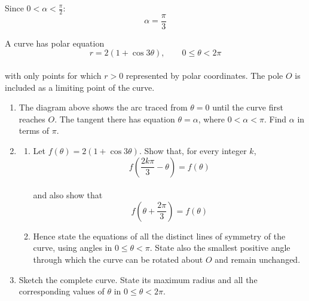 \documentclass[leqno]{article}
\begin{document}
\begin{enumerate}[
  label=\textbf{\arabic*.},
  leftmargin=*,
  topsep=0pt,
  partopsep=0pt,
  parsep=0pt
]
\begin{djsSolution}
\begin{enumerate}[label=\textbf{(\alph*)}, start=1]
Since \(0<\alpha<\frac{\pi}{2}\):
\[
\alpha=\dfrac{\pi}{3}
\]

\end{enumerate}
\end{djsSolution}

\newpage

\questionitem

\begin{figure}[H]
    \centering
{}
\end{figure}


A curve has polar equation
\[
r=2(1+\cos 3\theta),\qquad 0\leq\theta<2\pi
\] \\
with only points for which $r>0$ represented by polar coordinates. The pole $O$ is included as a limiting point of the curve. \\
\begin{enumerate}[label=\textbf{(\roman*)}]
\item The diagram above shows the arc traced from $\theta=0$ until the curve first reaches $O$. The tangent there has equation $\theta=\alpha$, where $0<\alpha<\pi$. Find $\alpha$ in terms of $\pi$.  \\
\item
\begin{enumerate}[label=(\alph*)]
\item Let $f(\theta)=2(1+\cos 3\theta)$. Show that, for every integer $k$,
\[
f\left(\frac{2k\pi}{3}-\theta\right)=f(\theta)
\] \\
and also show that
\[
f\left(\theta+\frac{2\pi}{3}\right)=f(\theta)
\] 
\item Hence state the equations of all the distinct lines of symmetry of the curve, using angles in $0\leq\theta<\pi$. State also the smallest positive angle through which the curve can be rotated about $O$ and remain unchanged.  \\
\end{enumerate}
\item Sketch the complete curve. State its maximum radius and all the corresponding values of $\theta$ in $0\leq\theta<2\pi$.  \\
\end{enumerate}


\end{enumerate}
\end{document}
